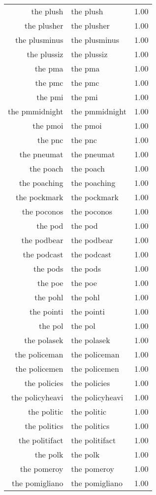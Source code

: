 \begin{table}[ht]
\begin{tabular}{rlr}
  the plush & the plush & 1.00 \\ 
  the plusher & the plusher & 1.00 \\ 
  the plusminus & the plusminus & 1.00 \\ 
  the plussiz & the plussiz & 1.00 \\ 
  the pma & the pma & 1.00 \\ 
  the pmc & the pmc & 1.00 \\ 
  the pmi & the pmi & 1.00 \\ 
  the pmmidnight & the pmmidnight & 1.00 \\ 
  the pmoi & the pmoi & 1.00 \\ 
  the pnc & the pnc & 1.00 \\ 
  the pneumat & the pneumat & 1.00 \\ 
  the poach & the poach & 1.00 \\ 
  the poaching & the poaching & 1.00 \\ 
  the pockmark & the pockmark & 1.00 \\ 
  the poconos & the poconos & 1.00 \\ 
  the pod & the pod & 1.00 \\ 
  the podbear & the podbear & 1.00 \\ 
  the podcast & the podcast & 1.00 \\ 
  the pods & the pods & 1.00 \\ 
  the poe & the poe & 1.00 \\ 
  the pohl & the pohl & 1.00 \\ 
  the pointi & the pointi & 1.00 \\ 
  the pol & the pol & 1.00 \\ 
  the polasek & the polasek & 1.00 \\ 
  the policeman & the policeman & 1.00 \\ 
  the policemen & the policemen & 1.00 \\ 
  the policies & the policies & 1.00 \\ 
  the policyheavi & the policyheavi & 1.00 \\ 
  the politic & the politic & 1.00 \\ 
  the politics & the politics & 1.00 \\ 
  the politifact & the politifact & 1.00 \\ 
  the polk & the polk & 1.00 \\ 
  the pomeroy & the pomeroy & 1.00 \\ 
  the pomigliano & the pomigliano & 1.00 \\ 

\end{tabular}
\end{table}
